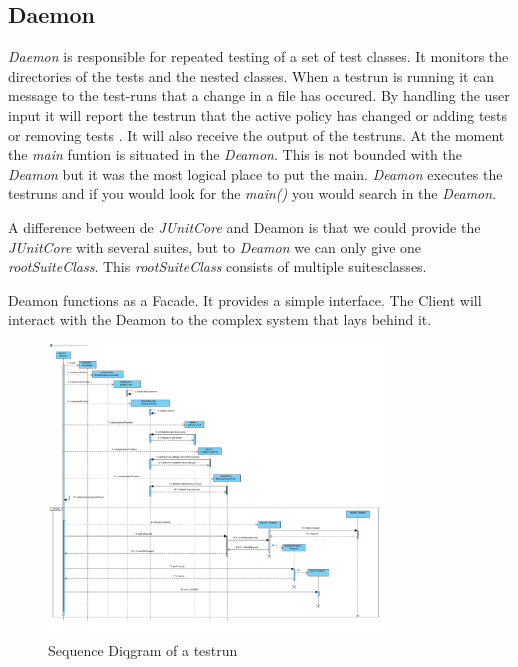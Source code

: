 \documentclass[i2]{oss}
\newcommand{\class}[1]{\emph{#1}}
\newcommand{\method}[1]{\emph{#1}}
\begin{document}

\subsection{Daemon}
\label{subssec: deamon}

\class{Daemon} is responsible for repeated testing of a set of test classes. It monitors the directories of the tests and the nested classes. When a testrun is running it can message to the test-runs that a change in a file has occured. By handling the user input it will report the testrun that the active policy has changed or adding tests or removing tests . It will also receive the output of the testruns.  
% 
At the moment the \method{main} funtion is situated in the \class{Deamon}. This is not bounded with the \class{Deamon} but it was the most logical place to put the main. \class{Deamon} executes the testruns and if you would look for the \method{main()} you would search in the \class{Deamon}.

A difference between de \class{JUnitCore} and Deamon is that we could provide the \class{JUnitCore} with several suites, but to \class{Deamon} we can only give one \class{rootSuiteClass}. This \class{rootSuiteClass} consists of multiple suitesclasses.

Deamon functions as a Facade. It provides a simple interface. The Client will interact with the Deamon to the complex system that lays behind it.




\begin{figure}[tbp]
\begin{center}
    \includegraphics[width=0.8\textwidth]{RunATestrun}
    \caption{Sequence Diqgram of a testrun}
	\label{fig:seq testrun}
\end{center}
\end{figure}
\end{document}
